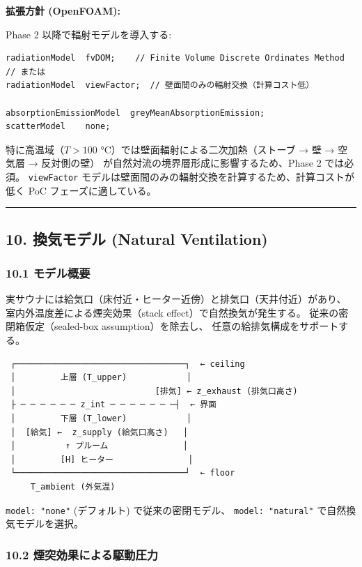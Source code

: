 \documentclass[a4paper,11pt]{article}
\begin{document}
\textbf{拡張方針 (OpenFOAM):}

Phase 2 以降で輻射モデルを導入する:

\begin{verbatim}
radiationModel  fvDOM;    // Finite Volume Discrete Ordinates Method
// または
radiationModel  viewFactor;  // 壁面間のみの輻射交換（計算コスト低）

absorptionEmissionModel  greyMeanAbsorptionEmission;
scatterModel    none;
\end{verbatim}

特に高温域（$T > 100$ °C）では壁面輻射による二次加熱（ストーブ → 壁 → 空気層 → 反対側の壁）
が自然対流の境界層形成に影響するため、Phase 2 では必須。
\texttt{viewFactor} モデルは壁面間のみの輻射交換を計算するため、計算コストが低く
PoC フェーズに適している。

\bigskip\hrule\bigskip

\subsection{10. 換気モデル (Natural Ventilation)}

\subsubsection{10.1 モデル概要}

実サウナには給気口（床付近・ヒーター近傍）と排気口（天井付近）があり、
室内外温度差による煙突効果（stack effect）で自然換気が発生する。
従来の密閉箱仮定（sealed-box assumption）を除去し、
任意の給排気構成をサポートする。

\begin{verbatim}
 ┌──────────────────────────────────┐  ← ceiling
 │         上層 (T_upper)            │
 │                            [排気] ← z_exhaust (排気口高さ)
 ├ ─ ─ ─ ─ ─ ─ z_int ─ ─ ─ ─ ─ ─ ─┤  ← 界面
 │         下層 (T_lower)            │
 │  [給気] ←  z_supply (給気口高さ)   │
 │          ↑ プルーム               │
 │         [H] ヒーター               │
 └──────────────────────────────────┘  ← floor
     T_ambient (外気温)
\end{verbatim}

\texttt{model: "none"} (デフォルト) で従来の密閉モデル、
\texttt{model: "natural"} で自然換気モデルを選択。

\subsubsection{10.2 煙突効果による駆動圧力}
\end{document}

